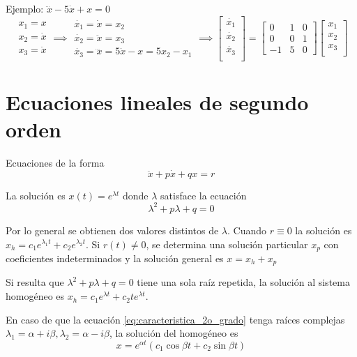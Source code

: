 \documentclass[a4paper]{article}
\begin{document}
Ejemplo: $ \dddot{x} - 5 \dot{x} + x = 0 $
\[
	\begin{array}{l}
		x_1 = x \\
		x_2 = \dot{x} \\
		x_3 = \ddot{x}
	\end{array}
	\implies
	\begin{array}{l}
		\dot{x_1} = \dot{x} = x_2 \\
		\dot{x_2} = \ddot{x} = x_3 \\
		\dot{x_3} = \dddot{x} = 5\dot{x} - x = 5 x_2 - x_1
	\end{array}
	\implies
	\begin{bmatrix}
		\dot{x_1} \\
		\dot{x_2} \\
		\dot{x_3} \\
	\end{bmatrix}
	=
	\begin{bmatrix}
		 0 & 1 & 0 \\
		 0 & 0 & 1 \\
		 -1 & 5 & 0
	\end{bmatrix}
	\begin{bmatrix}
		x_1 \\
		x_2 \\
		x_3 \\
	\end{bmatrix}
\]


\section{Ecuaciones lineales de segundo orden}%
\label{sec:ecuaciones_lineales_de_segundo_orden}

Ecuaciones de la forma
\begin{equation}
\label{eq:caracteristica_2o_grado}
	\ddot{x} + p \dot{x} + qx = r
\end{equation}

La solución es $ x(t) = e^{\lambda t} $ donde $ \lambda $ satisface la ecuación
\[
	\lambda^{2} + p \lambda + q = 0
\]

Por lo general se obtienen dos valores distintos de $\lambda$. Cuando $ r \equiv 0 $ la solución es $x_{h} = c_1 e^{\lambda_1 t} + c_2 e^{\lambda_2 t}$. Si $ r(t) \neq 0 $, se determina una solución particular $ x_p $ con coeficientes indeterminados y la solución general es $ x = x_h + x_p $

Si resulta que $  \lambda^{2} + p \lambda + q = 0$ tiene una sola raíz repetida, la solución al sistema homogéneo es $ x_h = c_1 e^{\lambda t} + c_2 t e^{\lambda t} $.

En caso de que la ecuación \ref{eq:caracteristica_2o_grado} tenga raíces complejas $ \lambda_1 = \alpha + i \beta, \lambda_2 = \alpha - i \beta $, la solución del homogéneo es
\[
	x = e^{\alpha t} ( c_1 \cos \beta t + c_2 \sin \beta t)
\]
\end{document}
